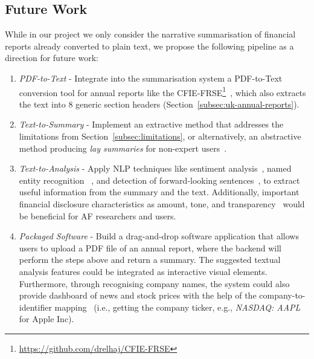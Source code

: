 \subsection{Future Work}\label{subsec:future-work}
While in our project we only consider the narrative summarisation of
financial reports already converted to plain text, we propose the following pipeline as a direction for future work:
\begin{enumerate}
    \item \emph{PDF-to-Text} - Integrate into the summarisation system a PDF-to-Text conversion tool for annual
    reports like the CFIE-FRSE\footnote{\url{https://github.com/drelhaj/CFIE-FRSE}}~\cite{elhaj2019multilingual}, which
    also extracts the text into 8 generic section headers (Section~\ref{subsec:uk-annual-reports}).
    \item \emph{Text-to-Summary} - Implement an extractive method that addresses the limitations from Section~\ref{subsec:limitations},
    or alternatively, an abstractive method producing \emph{lay summaries} for non-expert users~\cite{vinzelberg2023lay, Guo2020AutomatedLL}.
    \item \emph{Text-to-Analysis} - Apply NLP techniques like sentiment analysis~\cite{araci2019finbert}, named entity recognition
   ~\cite{zhang2022finbertmrc}, and detection of forward-looking sentences~\cite{stihec-etal-2021-preliminary},
    to extract useful information from the summary and the text.
    Additionally, important financial disclosure characteristics as amount, tone, and transparency~\cite{li2010textual, Li2011TextualAO}
    would be beneficial for AF researchers and users.
    \item \emph{Packaged Software} - Build a drag-and-drop software application that allows users to upload a PDF file of an
    annual report, where the backend will perform the steps above and return a summary.
    The suggested textual analysis features could be integrated as interactive visual elements.
    Furthermore, through recognising company names, the system could also provide dashboard of news and stock prices
    with the help of the company-to-identifier mapping~\cite{el-haj2019retrieving}
    (i.e., getting the company ticker, e.g., \emph{NASDAQ: AAPL} for Apple Inc).
\end{enumerate}